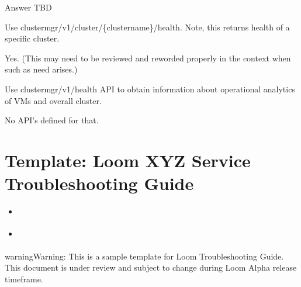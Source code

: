 \documentclass[letterpaper,10pt,english]{sphinxmanual}
\begin{document}

Answer TBD


Use clustermgr/v1/cluster/\{clustername\}/health.  Note, this returns health of a specific cluster.


Yes. (This may need to be reviewed and reworded properly in the context when such as need arises.)


Use clustermgr/v1/health API to obtain information about operational analytics of VMs and overall cluster.


No API’s defined for that.


\section{Template: Loom XYZ Service Troubleshooting Guide}
\label{\detokenize{mcdmp_docx_res:t-trbs-guide}}\label{\detokenize{mcdmp_docx_res:template-loom-xyz-service-troubleshooting-guide}}
\begin{sphinxShadowBox}
\begin{itemize}
\item {} 
\label{\detokenize{mcdmp_docx_res:id35}}{\hyperref[\detokenize{mcdmp_docx_res:service-issue-lorem-ipsum}]{}}

\item {} 
\label{\detokenize{mcdmp_docx_res:id36}}{\hyperref[\detokenize{mcdmp_docx_res:another-service-issue-lorem-ipsum}]{}}

\end{itemize}
\end{sphinxShadowBox}

\begin{sphinxadmonition}{warning}{Warning:}
This is a sample template for Loom Troubleshooting Guide.  This document is under review and subject to change during Loom Alpha release timeframe.
\end{sphinxadmonition}
\end{document}
